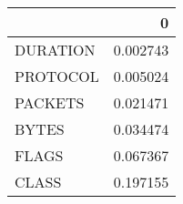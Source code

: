 \begin{tabular}{lr}
\toprule
{} &         0 \\
\midrule
DURATION &  0.002743 \\
PROTOCOL &  0.005024 \\
PACKETS  &  0.021471 \\
BYTES    &  0.034474 \\
FLAGS    &  0.067367 \\
CLASS    &  0.197155 \\
\bottomrule
\end{tabular}
